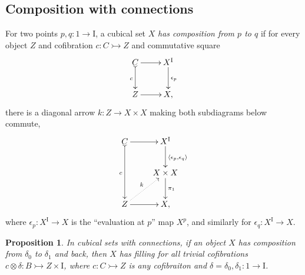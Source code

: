 \documentclass[12pt]{article}
\newcommand{\mono}{\ensuremath{\rightarrowtail}}
\newcommand{\ra}{\ensuremath{\rightarrow}}
\newcommand{\I}{\ensuremath{\mathrm{I}}}
\newtheorem{proposition}[theorem]{Proposition}
\newtheorem{lemma}[theorem]{Lemma}
\theoremstyle{remark}
\theoremstyle{definition}
\begin{document}
\subsection*{Composition with connections}\label{appendix:comptofillconnection}

For two points $p, q: 1 \ra \I$, a cubical set $X$ \emph{has composition from $p$ to $q$} if for every object $Z$ and cofibration $c:C\mono Z$ and commutative square 
\begin{equation}\label{apdiagram:composition3}
\xymatrix{
C \ar@{>->}[d]_{c} \ar[r]  & X^\I \ar[d]^{\epsilon_p} \\
Z \ar[r] & X,
}
\end{equation}
there is a diagonal arrow $k : Z \ra X\times X$ making both subdiagrams below commute,
\begin{equation}\label{apdiagram:composition2}
\xymatrix{
C \ar@{>->}[dd]_{c} \ar[r]  & X^\I \ar[d]^{\langle \epsilon_p, \epsilon_q\rangle} \\
& X\times X \ar[d]^{\pi_1} \\
Z \ar[r] \ar@{..>}[ru]^{k} & X,
}
\end{equation}
where $\epsilon_p : X^\I\ra X$ is the ``evaluation at $p$'' map $X^p$, and similarly for $\epsilon_q : X^\I\ra X$.  

\begin{proposition}
In cubical sets with connections, if an object $X$ has composition from $\delta_0$ to $\delta_1$ and back, then $X$ has filling for all trivial cofibrations $c\otimes \delta : B \mono Z\times \I$, where $c : C\mono Z$ is any cofibraiton and $\delta = \delta_0 , \delta_1 : 1\ra \I$. %
\end{proposition}

%
%

\end{document}
